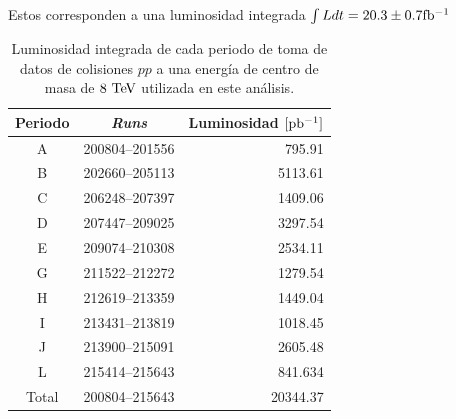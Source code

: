 Estos corresponden a una luminosidad integrada $\int L dt = 20.3 \pm 0.7 \mbox{fb$^{-1}$}$ \cite{lumi2012}

\begin{table}[ht]
  \centering
  \caption{Luminosidad integrada de cada periodo de toma de datos de
    colisiones $pp$ a una energía de centro de masa de $8 \tev$ utilizada
    en este análisis.}
  \begin{tabular}{c|c|r}
    \hline
    \hline
    Periodo & \emph{Runs} & Luminosidad $[\mbox{pb$^{-1}$}]$ \\
    \hline
    \hline
    A & 200804--201556 &  795.91 \\
    B & 202660--205113 &  5113.61 \\
    C & 206248--207397 &  1409.06 \\
    D & 207447--209025 &  3297.54 \\
    E & 209074--210308 &  2534.11 \\
    G & 211522--212272 &  1279.54 \\
    H & 212619--213359 &  1449.04 \\
    I  & 213431--213819 &  1018.45 \\
    J & 213900--215091 &  2605.48 \\
    L & 215414--215643 &  841.634 \\
    \hline
    \hline
    Total & 200804--215643 & 20344.37 \tabularnewline
    \hline
    \hline
  \end{tabular}
  \label{tab:data_periods}
\end{table}

